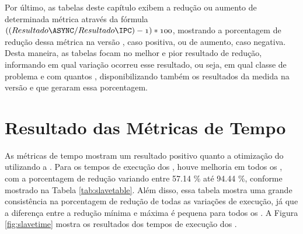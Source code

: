 Por último, as tabelas deste capítulo exibem a redução ou aumento de determinada métrica através da fórmula $\mathnormal{((Resultado \ASYNC / Resultado \IPC) - 1) * 100}$, mostrando a porcentagem de redução dessa métrica na versão \ASYNC, caso positiva, ou de aumento, caso negativa. Desta maneira, as tabelas focam no melhor e pior resultado de redução, informando em qual variação ocorreu esse resultado, ou seja, em qual classe de problema e com quantos \clusters, disponibilizando também os resultados da medida na versão \IPC e \ASYNC que geraram essa porcentagem.

\section{Resultado das Métricas de Tempo}
\label{sec:metricastempo}

As métricas de tempo mostram um resultado positivo quanto a otimização do \capb utilizando a \API \ASYNC. Para os tempos de execução dos \slaves, houve melhoria em todos os , com a porcentagem de redução variando entre 57.14 \% até 94.44 \%, conforme mostrado na Tabela \ref{tab:slavetable}. Além disso, essa tabela mostra uma grande consistência na porcentagem de redução de todas as variações de execução, já que a diferença entre a redução mínima e máxima é pequena para todos os . A Figura \ref{fig:slavetime} mostra os resultados dos tempos de execução dos \slaves.

\begin{table}[h]
\centering
\caption{Reduções ao comparar-se os tempos dos processos \slaves.}
\label{tab:slavetable}
\end{table}

